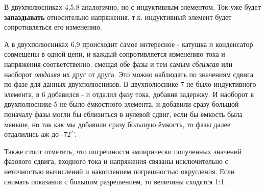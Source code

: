 В двухполюсниках 4,5,8 аналогично, но с индуктивным элементом. Ток уже будет \textbf{запаздывать} относительно напряжения, т.к. индуктивный элемент будет сопротивляться его изменению.

А в двухполюсниках 6,9 происходит самое интересное - катушка и конденсатор совмещены в одной цепи, и каждый сопротивляется изменению тока и напряжения соответственно, смещая обе фазы и тем самым \textit{сближая} или наоборот \textit{отдаляя} их друг от друга. Это можно наблюдать по значениям сдвига по фазе для данных двухполюсников. В двухполюснике 7 не было индуктивного элемента, в 6 добавился - и отдалил фазу тока, добавив задержку. И наоборот в двухполюснике 5 не было ёмкостного элемента, и добавили сразу большой - поначалу фазы могли бы сблизиться в нулевой сдвиг, если бы ёмкость была меньше, но так как мы добавили сразу большую ёмкость, то фазы далее отдалились аж до -72^\circ.

Также стоит отметить, что погрешности эмпирически полученных значений фазового сдвига, входного тока и напряжения связаны исключительно с неточностью вычислений и накоплением погрешностью округления. Если снимать показания с большим разрешением, то величины сходятся 1:1.
